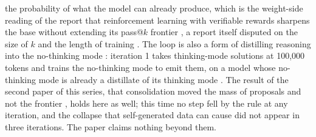 \documentclass[11pt]{article}
\begin{document}
the probability of what the model can already produce, which is the
weight-side reading of the report that reinforcement learning with
verifiable rewards sharpens the base without extending its pass@$k$
frontier \citep{yue2025rlvr}, a report itself disputed on the size of $k$
and the length of training \citep{liu2025prorl,brown2024monkeys,wu2025leash,karan2026sampling}.
The loop is also a form of distilling reasoning into the no-thinking mode
\citep{yu2024system2}: iteration 1 takes thinking-mode solutions at
100,000 tokens and trains the no-thinking mode to emit them, on a model
whose no-thinking mode is already a distillate of its thinking mode
\citep{qwen2025qwen3}. The result of the second paper of this series, that
consolidation moved the mass of proposals and not the frontier
\citep{ono2026mass}, holds here as well; this time no step fell by the
rule at any iteration, and the collapse that self-generated data can cause
\citep{shumailov2024collapse,gerstgrasser2024collapse} did not appear in
three iterations. The paper claims nothing beyond them.
\end{document}
